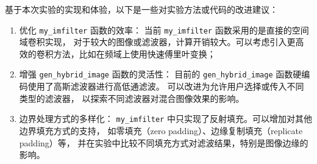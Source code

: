 
基于本次实验的实现和体验，以下是一些对实验方法或代码的改进建议：

\begin{enumerate}
    \item 优化 \texttt{my\_imfilter} 函数的效率：
    当前 \texttt{my\_imfilter} 函数采用的是直接的空间域卷积实现，
    对于较大的图像或滤波器，计算开销较大。可以考虑引入更高效的卷积方法，比如在频域上使用快速傅里叶变换；

    \item 增强 \texttt{gen\_hybrid\_image} 函数的灵活性：
    目前的 \texttt{gen\_hybrid\_image} 函数硬编码使用了高斯滤波器进行高低通滤波。
    可以改进为允许用户选择或传入不同类型的滤波器，
    以探索不同滤波器对混合图像效果的影响。

    \item 边界处理方式的多样化：
    \texttt{my\_imfilter} 中只实现了反射填充。可以增加对其他边界填充方式的支持，
    如零填充（zero padding）、边缘复制填充（replicate padding）等，
    并在实验中比较不同填充方式对滤波结果，特别是图像边缘的影响。

\end{enumerate}
